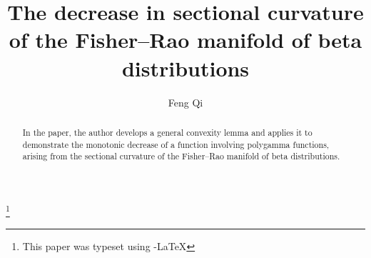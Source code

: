 \documentclass[reqno]{amsart}%
\theoremstyle{plain}
\theoremstyle{remark}
\begin{document}
\title[Sectional curvature of Fisher--Rao manifold]
{The decrease in sectional curvature of the Fisher--Rao manifold of beta distributions}

\author[F. Qi]{Feng Qi}
\address{School of Mathematics and Physics, Hulunbuir University, Hulunbuir 021008, Inner Mongolia, China;
17709 Sabal Court, University Village, Dallas, TX 75252-8024, USA}

\begin{abstract}
In the paper, the author develops a general convexity lemma and applies it to demonstrate the monotonic decrease of a function involving polygamma functions, arising from the sectional curvature of the Fisher--Rao manifold of beta distributions.
\end{abstract}



\thanks{This paper was typeset using \AmS-\LaTeX}

\maketitle
\end{document}
